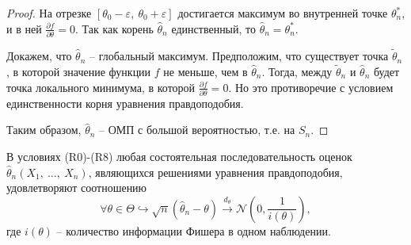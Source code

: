 \begin{proof}
    
    
    
    На отрезке $\displaystyle [ \theta _{0} -\varepsilon ,\ \theta _{0} +\varepsilon ]$ достигается максимум во внутренней точке $\displaystyle \theta _{n}^{*}$, и в ней $\displaystyle \frac{\partial f}{\partial \theta } =0$. Так как корень $\displaystyle \hat{\theta }_{n}$ единственный, то $\displaystyle \hat{\theta }_{n} =\theta _{n}^{*}$.
    
    Докажем, что $\displaystyle \hat{\theta }_{n}$ -- глобальный максимум. Предположим, что существует точка $\displaystyle \tilde{\theta }_{n}$, в которой значение функции $\displaystyle f$ не меньше, чем в $\displaystyle \hat{\theta }_{n}$. Тогда, между $\displaystyle \tilde{\theta }_{n}$ и $\displaystyle \hat{\theta }_{n}$ будет точка локального минимума, в которой $\displaystyle \frac{\partial f}{\partial \theta } =0$. Но это противоречие с условием единственности корня уравнения правдоподобия.
    
    Таким образом, $\displaystyle \hat{\theta }_{n}$ -- ОМП с большой вероятностью, т.е. на $\displaystyle S_{n}$.
\end{proof}
\begin{theorem}
    В условиях (R0)-(R8) любая состоятельная последовательность оценок $\displaystyle \hat{\theta }_{n}( X_{1} ,\ \dotsc ,\ X_{n})$, являющихся решениями уравнения правдоподобия, удовлетворяют соотношению
    \begin{equation*}
        \forall \theta \in \Theta \hookrightarrow \sqrt{n}(\hat{\theta }_{n} -\theta )\xrightarrow{d_{\theta }}\mathcal{N}\left( 0,\dfrac{1}{i( \theta )}\right) ,
    \end{equation*}
    где $\displaystyle i( \theta )$ -- количество информации Фишера в одном наблюдении.
\end{theorem}
